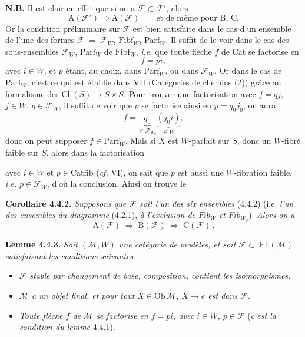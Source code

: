 \documentclass[11pt]{article}
\newcommand{\msp}[1]{\marginpar{\footnotesize [#1]}}
\newcommand{\Fl}{\operatorname{Fl}}
\newcommand{\Fibf}{\mathrm{Fibf}}
\newcommand{\Parf}{\mathrm{Parf}}
\newcommand{\Catfib}{\mathrm{Catfib}}
\newcommand{\cF}{\mathcal{F}}
\newcommand{\cM}{\mathcal{M}}
\begin{document}
\textbf{N.B.} Il est clair en effet que si on a $\cF \subset \cF'$, alors
\[
\mathrm{A}(\cF') \Longrightarrow \mathrm{A}(\cF) \qquad \text{et de même pour B, C.}
\tag*{$(*)$}
\]
Or la condition préliminaire sur $\cF$ est bien satisfaite dans le cas d'un ensemble de l'une des formes $\cF \;=\; \cF_W$, $\Fibf_W$, $\Parf_W$. Il suffit de le voir dans le cas des sous-ensembles $\cF_W$, $\Parf_W$ de $\Fibf_W$, \textit{i.e.} que toute flèche $f$ de Cat se factorise en
\[
f = pi,
\]
avec $i \in W$, et $p$ étant, au choix, dans $\Parf_W$, ou dans $\cF_W$. Or dans le cas de $\Parf_W$, \marginpar{$\|$}c'est ce qui est établie dans VII (Catégories de chemins (2)) grâce au formalisme des $\underline{\mathrm{Ch}}(S) \longrightarrow S \times S$. Pour trouver une factorisation avec $f = qj$, $j \in W$, $q \in \cF_W$, il suffit de voir que $p$ se factorise ainsi en $p = q_0 j_0$, on aura %
\[
f = \underbrace{q_0}_{\in \cF_{W_0}} \underbrace{(j_0 i)}_{\in W},
\]
donc on peut supposer $f \in \Parf_W$. Mais si $X$ est $W$-parfait sur $S$, donc un
\msp{page 43}
$W$-fibré faible sur $S$, alors dans la factorisation
\begin{center}
\end{center}
avec $i \in W$ et $p \in \Catfib$ (\textit{cf.} VI), on sait que $p$ est aussi une $W$-fibration faible, \textit{i.e.} $p \in \cF_W$, d'où la conclusion. Ainsi on trouve le

\textbf{Corollaire 4.4.2.} \textit{Supposons que $\cF$ soit l'un des six ensembles} (4.4.2) (i.e. \textit{l'un des ensembles du diagramme} (4.2.1), \textit{à l'exclusion de $\mathit{Fib}_W$ et $\mathit{Fib}_{W_0}$}). \textit{Alors on a}
\[
\mathrm{A}(\cF) \;\Longrightarrow\; \mathrm{B}(\cF) \;\Longrightarrow\; \mathrm{C}(\cF)\,.
\]

\textbf{Lemme 4.4.3.} \textit{Soit $(\cM, W)$ une catégorie de modèles, et soit $\cF \subset \Fl(\cM)$ satisfaisant les conditions suivantes}
\begin{itemize}[leftmargin=3em]
\item[1)] \textit{$\cF$ stable par changement de base, composition, contient les isomorphismes.}
\item[2)] \textit{$\cM$ a un objet final, et pour tout $X \in \mathrm{Ob}\,\cM$, $X \longrightarrow e$ est dans $\cF$.}
\item[3)] \textit{Toute flèche $f$ de $\cM$ se factorise en $f = pi$, avec $i \in W$, $p \in \cF$} (\textit{c'est la condition du lemme} 4.4.1).
\end{itemize}
\end{document}
